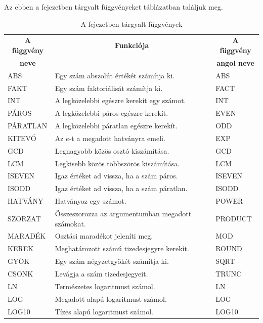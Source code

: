 Az ebben a fejezetben tárgyalt függvényeket 
táblázatban találjuk meg.

\begin{table}[!h]
\begin{center}
\caption{A fejezetben tárgyalt függvények}\label{8-fejezetFüggvények}
\begin{tabular}{|m{2.5cm}|m{8cm}|m{3cm}|}
\hline
\multicolumn{1}{|c|}{\textbf{A függvény}}&
\multicolumn{1}{c|}{\textbf{Funkciója}}&
\multicolumn{1}{c|}{\textbf{A függvény}} \\
\multicolumn{1}{|c|}{\textbf{neve}} & &
\multicolumn{1}{c|}{\textbf{angol neve}} \\
\hline
ABS & Egy szám abszolút értékét számítja ki. & ABS\\ \hline
FAKT & Egy szám faktoriálisát számítja ki. & FACT\\ \hline
INT & A legközelebbi egészre kerekít  egy számot. & INT\\ \hline
PÁROS & A legközelebbi páros egészre kerekít. & EVEN\\ \hline
PÁRATLAN & A legközelebbi páratlan egészre kerekít. & ODD\\ \hline
KITEVŐ & Az $e$-t a megadott hatványra emeli. & EXP \\ \hline
GCD & Legnagyobb közös osztó kiszámítása. & GCD\\ \hline
LCM & Legkisebb közös többszörös kiszámítása. & LCM\\ \hline
ISEVEN & Igaz értéket ad vissza, ha a szám páros. & ISEVEN\\ \hline
ISODD & Igaz értéket ad vissza, ha a szám páratlan. & ISODD\\ \hline
HATVÁNY & Hatványoz egy számot. & POWER\\ \hline
SZORZAT & Összeszorozza az argumentumban megadott számokat. & PRODUCT\\ \hline
MARADÉK & Osztási maradékot jeleníti meg. & MOD\\ \hline
KEREK & Meghatározott számú tizedesjegyre kerekít. & ROUND\\ \hline
GYÖK & Egy szám négyzetgyökét számítja ki. & SQRT\\ \hline
CSONK & Levágja a szám tizedesjegyeit. & TRUNC\\ \hline
LN & Természetes logaritmust számol. & LN\\ \hline
LOG & Megadott alapú logaritmust számol. & LOG\\ \hline
LOG10 & Tízes alapú logaritmust számol. & LOG10\\ \hline

\end{tabular}
\end{center}
\end{table}
